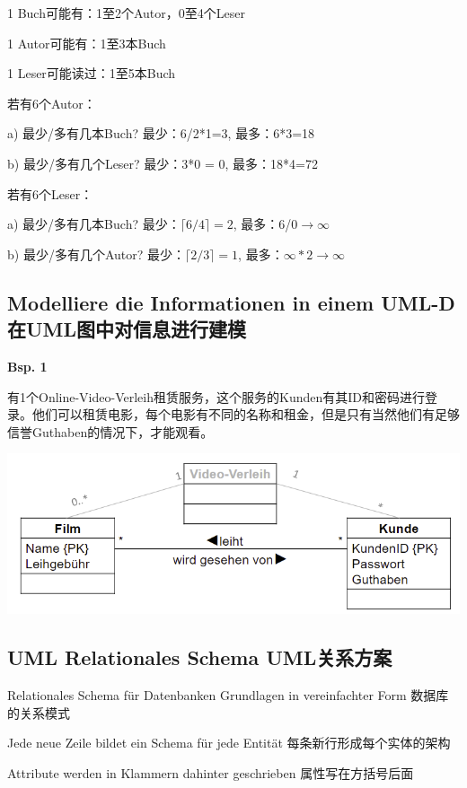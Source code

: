 \documentclass[fleqn]{article}
\begin{document}
1 Buch可能有：1至2个Autor，0至4个Leser

1 Autor可能有：1至3本Buch

1 Leser可能读过：1至5本Buch

\noindent 若有6个Autor：

a) 最少/多有几本Buch? \qquad 最少：6/2*1=3, 最多：6*3=18

b) 最少/多有几个Leser? \qquad 最少：3*0 = 0, 最多：18*4=72

\noindent 若有6个Leser：

a) 最少/多有几本Buch? \qquad 最少：$\lceil 6/4 \rceil = 2$, 最多：6/0$\rightarrow\infty$

b) 最少/多有几个Autor? \qquad 最少：$\lceil 2/3 \rceil = 1$, 最多：$\infty * 2 \rightarrow\infty$

\subsection{Modelliere die Informationen in einem UML-D 在UML图中对信息进行建模}

\noindent\textbf{Bsp. 1}

有1个Online-Video-Verleih租赁服务，这个服务的Kunden有其ID和密码进行登录。他们可以租赁电影，每个电影有不同的名称和租金，但是只有当然他们有足够信誉Guthaben的情况下，才能观看。

\begin{center} 
    \includegraphics[scale=0.5]{4.png}
\end{center}

\subsection{UML Relationales Schema UML关系方案}

\noindent Relationales Schema für Datenbanken Grundlagen in vereinfachter Form 数据库的关系模式

\noindent Jede neue Zeile bildet ein Schema für jede Entität 每条新行形成每个实体的架构

\noindent Attribute werden in Klammern dahinter geschrieben 属性写在方括号后面
\end{document}
